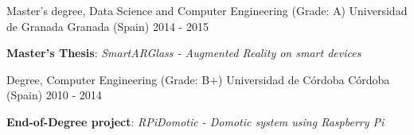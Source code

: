 

\begin{cventries}

  \cventry
    {Master's degree, Data Science and Computer Engineering (Grade: A)} %
    {Universidad de Granada} %
    {Granada (Spain)} %
    {2014 - 2015} %
    {
      \begin{cvitems} %
        \item {\textbf{Master's Thesis}: \textit{SmartARGlass - Augmented Reality on smart devices}}
      \end{cvitems}
    }
  \cventry
    {Degree, Computer Engineering (Grade: B+)} %
    {Universidad de Córdoba} %
    {Córdoba (Spain)} %
    {2010 - 2014} %
    {
      \begin{cvitems} %
        \item {\textbf{End-of-Degree project}: \textit{RPiDomotic - Domotic system using Raspberry Pi}}
      \end{cvitems}
    }

\end{cventries}
